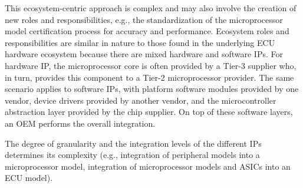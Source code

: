 This ecosystem-centric approach is complex and may also involve the creation of new roles and responsibilities, e.g., the standardization of the microprocessor model certification process for accuracy and performance.
Ecosystem roles and responsibilities are similar in nature to those found in the underlying ECU hardware ecosystem because there are mixed hardware and software IPs.
For hardware IP, the microprocessor core is often provided by a Tier-3 supplier who, in turn, provides this component to a Tier-2 microprocessor provider. 
The same scenario applies to software IPs, with platform software modules provided by one vendor, device drivers provided by another vendor, and the microcontroller abstraction layer provided by the chip supplier.
On top of these software layers, an OEM performs the overall integration.

The degree of granularity and the integration levels of the different IPs determines its complexity (e.g., integration of peripheral models into a microprocessor model, integration of microprocessor models and ASICs into an ECU model).




